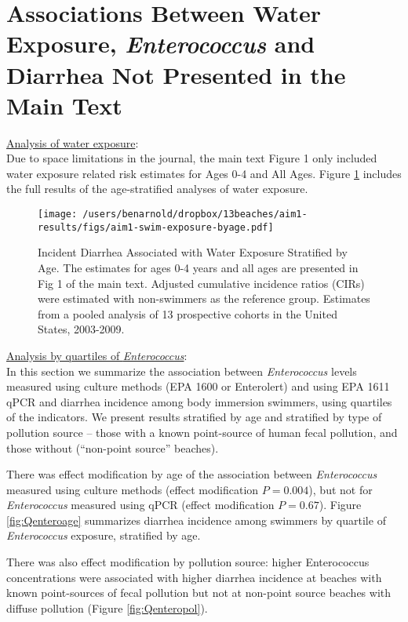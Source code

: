 \documentclass[12pt]{article}\usepackage[]{graphicx}\usepackage[]{color}
\begin{document}
\section{Associations Between Water Exposure, \emph{Enterococcus} and Diarrhea Not Presented in the Main Text}

\underline{Analysis of water exposure}: \\
Due to space limitations in the journal, the main text Figure 1 only included water exposure related risk estimates for Ages 0-4 and All Ages. Figure \ref{fig:swimex} includes the full results of the age-stratified analyses of water exposure.

\begin{landscape}
\begin{figure}[h!tb]
\begin{center}
\texttt{[image: /users/benarnold/dropbox/13beaches/aim1-results/figs/aim1-swim-exposure-byage.pdf]}
\caption{Incident Diarrhea Associated with Water Exposure Stratified by Age. The estimates for ages 0-4 years and all ages are presented in Fig 1 of the main text. Adjusted cumulative incidence ratios (CIRs) were estimated with non-swimmers as the reference group. Estimates from a pooled analysis of 13 prospective cohorts in the United States, 2003-2009.}
\label{fig:swimex}
\end{center}
\end{figure}
\end{landscape}


\underline{Analysis by quartiles of \textit{Enterococcus}}: \\
In this section we summarize the association between \emph{Enterococcus} levels measured using culture methods (EPA 1600 or Enterolert) and using EPA 1611 qPCR and diarrhea incidence among body immersion swimmers, using quartiles of the indicators.  We present results stratified by age and stratified by type of pollution source -- those with a known point-source of human fecal pollution, and those without (``non-point source'' beaches).  

There was effect modification by age of the association between \textit{Enterococcus} measured using culture methods (effect modification $P=0.004$), but not for \textit{Enterococcus} measured using qPCR (effect modification $P=0.67$).  Figure  \ref{fig:Qenteroage} summarizes diarrhea incidence among swimmers by quartile of \textit{Enterococcus} exposure, stratified by age.

There was also effect modification by pollution source: higher Enterococcus concentrations were associated with higher diarrhea incidence at beaches with known point-sources of fecal pollution but not at non-point source beaches with diffuse pollution (Figure \ref{fig:Qenteropol}).
\end{document}
